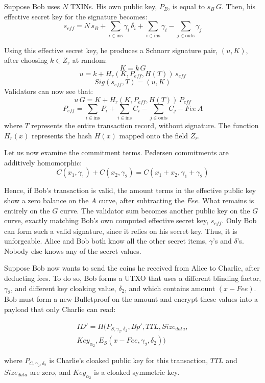 \documentclass[a4paper, 10pt, conference]{ieeeconf}
\begin{document}
Suppose Bob uses $N$ TXINs. His own public key, $P_B$, is equal to $s_B \, G$. Then, his effective secret key for the signature becomes:
$$s_{\mathit{eff}} = N \, s_B + \sum_{i \in \text{ins}} {\gamma_i \, \delta_i} + \sum_{i \in \text{ins}}{\gamma_i} - \sum_{j \in \text{outs}}{ \gamma_j}$$

Using this effective secret key, he produces a Schnorr signature pair, $(u, K)$, after choosing $k \in Z_r$ at random:
$$K = k \, G$$
$$u = k + H_r(K, P_{eff}, H(T)) \, s_{\mathit{eff}}$$
$$Sig(s_{eff},T) = (u, K)$$
Validators can now see that:
$$u \, G = K + H_r(K, P_{eff}, H(T)) \, P_{eff}$$
$$P_{\mathit{eff}} = \sum_{i \in \text{ins}}{P_i} + \sum_{i \in \text{ins}}{C_i} - \sum_{j \in \text{outs}}{C_j} - \mathit{Fee} \, A$$
where $T$ represents the entire transaction record, without signature. The function $H_r(x)$ represents the hash $H(x)$ mapped onto the field $Z_r$.

Let us now examine the commitment terms. Pedersen commitments are additively homomorphic:
$$C(x_1, \gamma_1) + C(x_2, \gamma_2) = C(x_1 + x_2, \gamma_1 + \gamma_2)$$

Hence, if Bob's transaction is valid, the amount terms in the effective public key show a zero balance on the $A$ curve, after subtracting the $\mathit{Fee}$. What remains is entirely on the $G$ curve. The validator sum becomes another public key on the $G$ curve, exactly matching Bob's own computed effective secret key, $s_{\mathit{eff}}$. Only Bob can form such a valid signature, since it relies on his secret key. Thus, it is unforgeable. Alice and Bob both know all the other secret items, $\gamma$'s and $\delta$'s. Nobody else knows any of the secret values.

Suppose Bob now wants to send the coins he received from Alice to Charlie, after deducting fees. To do so, Bob forms a UTXO that uses a different blinding factor, $\gamma_2$, and different key cloaking value, $\delta_2$, and which contains amount $(x - \mathit{Fee})$. Bob must form a new Bulletproof on the amount and encrypt these values into a payload that only Charlie can read:

\begin{multline*}
ID' = H(P_{S, \gamma_2, \delta_2}, Bp', TTL, Size_{data}, \\
          Key_{\alpha_2}, E_S(x - Fee, \gamma_2, \delta_2))
\end{multline*}

where $P_{C, \gamma_2, \delta_2}$ is Charlie's cloaked public key for this transaction, $TTL$ and $Size_{data}$ are zero, and $Key_{\alpha_2}$ is a cloaked symmetric key. 
\end{document}
